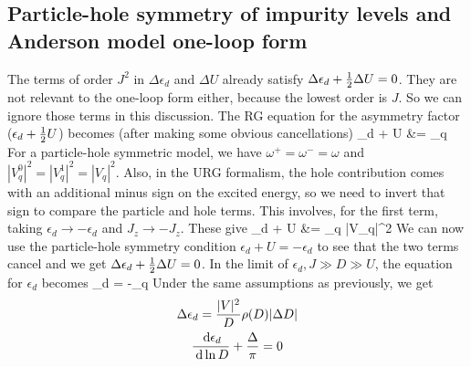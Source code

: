 \documentclass[14pt]{extarticle}
\numberwithin{equation}{section}
\begin{document}
\subsection{Particle-hole symmetry of impurity levels and Anderson model one-loop form}
The terms of order \(J^2\) in \(\Delta \epsilon_d\) and \(\Delta U\) already satisfy \(\Delta \epsilon_d + \frac{1}{2} \Delta U = 0\). They are not relevant to the one-loop form either, because the lowest order is \(J\). So we can ignore those terms in this discussion. The RG equation for the asymmetry factor (\(\epsilon_d + \frac{1}{2} U\)) becomes (after making some obvious cancellations)
\beq
\Delta \epsilon_d + \hf \Delta U &= \sum_q 
\eeq
For a particle-hole symmetric model, we have \(\omega^+ = \omega^- = \omega\) and \(|V_q^0|^2 = |V_q^1|^2 = |V_q|^2\). Also, in the URG formalism, the hole contribution comes with an additional minus sign on the excited energy, so we need to invert that sign to compare the particle and hole terms. This involves, for the first term, taking \(\epsilon_d \to -\epsilon_d\) and \(J_z \to -J_z\). These give
\beq
\Delta \epsilon_d + \hf \Delta U &= \sum_q |V_q|^2 
\eeq
We can now use the particle-hole symmetry condition \(\epsilon_d +  U = -\epsilon_d\) to see that the two terms cancel and we get \(\Delta \epsilon_d + \frac{1}{2} \Delta U =0\).
\pb
In the limit of \(\epsilon_d, J \gg D \gg U \), the equation for \(\epsilon_d\) becomes
\beq
\Delta \epsilon_d = -\sum_q 
\eeq
Under the same assumptions as previously, we get
\begin{gather*}
\Delta \epsilon_d = \frac{|V|^2 }{D}\rho(D) |\Delta D|\\
\frac{\:\mathrm{d}\epsilon_d}{\:\mathrm{d}\ln D} + \frac{\Delta}{\pi} = 0 
\end{gather*}
\end{document}
